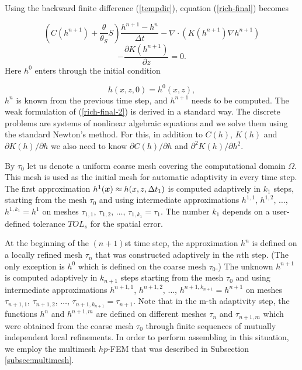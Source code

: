 \documentclass[final,3p,times,twocolumn]{elsarticle}
\newcommand{\bfx}{\mbox{\boldmath $x$}}
\begin{document}
Using the backward finite difference (\ref{tempdir}), equation (\ref{rich-final}) becomes

$$
\left(C(h^{n+1})
+ \frac{\theta}{\theta_S} S \right) \frac{h^{n+1} - h^n}{\Delta t}
- \nabla \cdot (K(h^{n+1})\nabla h^{n+1})
$$
\begin{equation}\label{rich-final-2}
 - \frac{\partial K(h^{n+1})}{\partial z} = 0.
\end{equation}
Here $h^0$ enters through the initial condition 

\begin{equation}
  h(x, z, 0) = h^0(x,z),
\end{equation}
$h^n$ is known from the previous time step, 
and $h^{n+1}$ needs to be computed. The weak formulation of (\ref{rich-final-2})
is derived in a standard way. The discrete problems are systems of nonlinear
algebraic equations and we solve them using the standard Newton's method. 
For this, in addition to $C(h)$, $K(h)$ and $\partial K(h) / \partial h$ we also 
need to know $\partial C(h) / \partial h$ and $\partial^2 K(h) / \partial h^2$.


By $\tau_0$ let us denote a uniform coarse mesh covering the computational domain $\Omega$. This
mesh is used as the initial mesh for automatic adaptivity in every time step.
The first approximation $h^1(\bfx) \approx h(x, z, \Delta t_1)$ is computed adaptively 
in $k_1$ steps, starting from the 
mesh $\tau_0$ and using intermediate approximations $h^{1,1}$, $h^{1,2}$, $\ldots$, $h^{1,k_1} = h^1$ 
on meshes $\tau_{1,1}$, $\tau_{1,2}$, $\ldots$, $\tau_{1,k_{1}} = \tau_{1}$. The number $k_1$ depends 
on a user-defined tolerance $TOL_s$ for the spatial error. 

At the beginning of the $(n+1)$st time step, the approximation $h^n$ is defined on a locally 
refined mesh $\tau_n$ that was constructed adaptively in the $n$th step.
(The only exception is $h^0$ which is defined on the coarse mesh $\tau_0$.)
The unknown $h^{n+1}$ is computed adaptively in $k_{n+1}$ steps starting from the 
mesh $\tau_0$ and using intermediate approximations $h^{n+1,1}$, $h^{n+1,2}$, $\ldots$, $h^{n+1,k_{n+1}} = h^{n+1}$ 
on meshes $\tau_{n+1,1}$, $\tau_{n+1,2}$, $\ldots$, $\tau_{n+1,k_{n+1}} = \tau_{n+1}$. 
Note that in the m-th adaptivity step, the functions $h^n$ and $h^{n+1, m}$ are defined on 
different meshes $\tau_n$ and $\tau_{n+1,m}$ which were obtained 
from the coarse mesh $\tau_0$ through finite sequences of mutually independent 
local refinements. In order to perform assembling in this situation, we employ the 
multimesh $hp$-FEM that was described in Subsection \ref{subsec:multimesh}.
\end{document}
